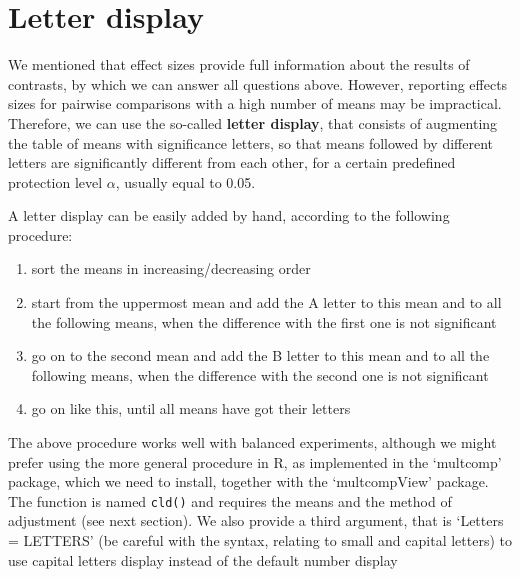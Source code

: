 \documentclass[a4paper,12pt,oneside]{book}
\providecommand{\tightlist}{%
  \setlength{\itemsep}{0pt}\setlength{\parskip}{0pt}}
\begin{document}
\hypertarget{letter-display}{%
\section{Letter display}\label{letter-display}}

We mentioned that effect sizes provide full information about the results of contrasts, by which we can answer all questions above. However, reporting effects sizes for pairwise comparisons with a high number of means may be impractical. Therefore, we can use the so-called \textbf{letter display}, that consists of augmenting the table of means with significance letters, so that means followed by different letters are significantly different from each other, for a certain predefined protection level \(\alpha\), usually equal to 0.05.

A letter display can be easily added by hand, according to the following procedure:

\begin{enumerate}
\def\labelenumi{\arabic{enumi}.}
\tightlist
\item
  sort the means in increasing/decreasing order
\item
  start from the uppermost mean and add the A letter to this mean and to all the following means, when the difference with the first one is not significant
\item
  go on to the second mean and add the B letter to this mean and to all the following means, when the difference with the second one is not significant
\item
  go on like this, until all means have got their letters
\end{enumerate}

The above procedure works well with balanced experiments, although we might prefer using the more general procedure in R, as implemented in the `multcomp' package, which we need to install, together with the `multcompView' package. The function is named \texttt{cld()} and requires the means and the method of adjustment (see next section). We also provide a third argument, that is `Letters = LETTERS' (be careful with the syntax, relating to small and capital letters) to use capital letters display instead of the default number display
\end{document}

